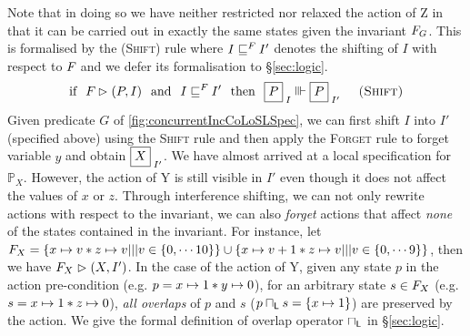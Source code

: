 %
Note that in doing so we have neither restricted nor relaxed the action of \textsf{Z} in that it can be carried out in exactly the same states given the invariant $F_{G}$. This is formalised by the \textsc{(Shift)} rule where $I \sqsubseteq^{F_{}} I'$ denotes the shifting of $I$ with respect to $F_{}$ and we defer its formalisation to \S\ref{sec:logic}.
%
\[
	\text{if}\hspace*{0.25cm} \fence{} \fences (P, I) 
	\hspace*{0.25cm}\text{and}\hspace*{0.25cm} I \weakenI{\fence{}} I'
	\hspace*{0.25cm}\text{then}\hspace*{0.25cm}
	\shared{P}{I} \Vvdash \shared{P}{I'} \hspace*{0.5cm} \textsc{(Shift)}
\]
%
Given predicate $G$ of \fig\ref{fig:concurrentIncCoLoSLSpec}, we can first shift $I$ into $I'$ (specified above) using the \textsc{Shift} rule and then apply the \textsc{Forget} rule to forget variable $y$ and obtain $\shared{X}{I'}$.
We have almost arrived at a local specification for $\mathbb{P}_X$. However, the action of \textsf{Y} is still visible in $I'$ even though it does not affect the values of $x$ or $z$. Through interference shifting, we can not only rewrite actions with respect to the invariant, we can also \emph{forget} actions that affect \emph{none} of the states contained in the invariant. For instance, let $F_{X} = \left\{x \mapsto v * z \mapsto v ||| v \in \{0, \cdots 10\} \right\} \cup \left\{x \mapsto v+1 * z \mapsto v ||| v \in \{0, \cdots 9 \} \right\}$, then we have $F_{X} \mathrel{\rhd} (X, I')$. In the case of the action of \textsf{Y}, given any state $p$ in the action pre-condition (e.g. $p = x \mapsto 1 * y \mapsto 0$), for an arbitrary state $s \in F_{X}$ (e.g. $s = x \mapsto 1 * z \mapsto 0$), \emph{all overlaps} of $p$ and $s$ ($p \sqcap_{\textsf{L}} s = \{x \mapsto 1\}$) are preserved by the action. We give the formal definition of overlap operator $\sqcap_{\textsf{L}}$ in \S\ref{sec:logic}. 
%
%

